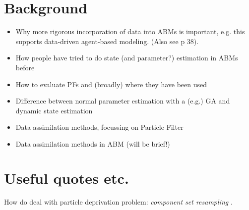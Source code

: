 \section{Background\label{background}}

\begin{itemize}
\item Why more rigorous incorporation of data into ABMs is important, e.g. this supports data-driven agent-based modeling. (Also see \citet{wang_data_2015} p 38).
\item How people have tried to do state (and parameter?) estimation in ABMs before
\item How to evaluate PFs and (broadly) where they have been used
\item Difference between normal parameter estimation with a (e.g.) GA and dynamic state estimation
\item Data assimilation methods, focussing on Particle Filter
\item Data assimilation methods in ABM (will be brief!)
\end{itemize}


\section*{Useful quotes etc.}

How do deal with particle deprivation problem: \textit{component set resampling} \citep{wang_data_2015}.